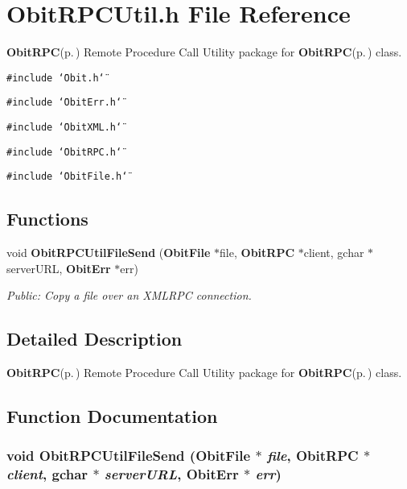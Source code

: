 \section{Obit\-RPCUtil.h File Reference}
\label{ObitRPCUtil_8h}
{\bf Obit\-RPC}{\rm (p.\,\pageref{structObitRPC})} Remote Procedure Call Utility package for {\bf Obit\-RPC}{\rm (p.\,\pageref{structObitRPC})} class. 

{\tt \#include \char`\"{}Obit.h\char`\"{}}\par
{\tt \#include \char`\"{}Obit\-Err.h\char`\"{}}\par
{\tt \#include \char`\"{}Obit\-XML.h\char`\"{}}\par
{\tt \#include \char`\"{}Obit\-RPC.h\char`\"{}}\par
{\tt \#include \char`\"{}Obit\-File.h\char`\"{}}\par
\subsection*{Functions}
\begin{CompactItemize}
\item 
void {\bf Obit\-RPCUtil\-File\-Send} ({\bf Obit\-File} $\ast$file, {\bf Obit\-RPC} $\ast$client, gchar $\ast$server\-URL, {\bf Obit\-Err} $\ast$err)
\begin{CompactList}\small\item\em Public: Copy a file over an XMLRPC connection. \item\end{CompactList}\end{CompactItemize}


\subsection{Detailed Description}
{\bf Obit\-RPC}{\rm (p.\,\pageref{structObitRPC})} Remote Procedure Call Utility package for {\bf Obit\-RPC}{\rm (p.\,\pageref{structObitRPC})} class. 



\subsection{Function Documentation}
\subsubsection{\setlength{\rightskip}{0pt plus 5cm}void Obit\-RPCUtil\-File\-Send ({\bf Obit\-File} $\ast$ {\em file}, {\bf Obit\-RPC} $\ast$ {\em client}, gchar $\ast$ {\em server\-URL}, {\bf Obit\-Err} $\ast$ {\em err})}\label{ObitRPCUtil_8h_a0}


